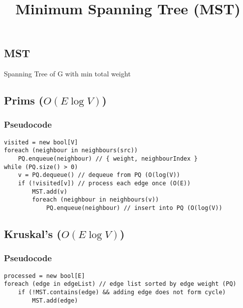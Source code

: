 \documentclass[12pt]{article}
\title{\textbf{Minimum Spanning Tree (MST)}}
\date{}
\begin{document}
\maketitle

\begin{spacing}{1.5}

\section{MST}

\begin{itemize*}
	\item Spanning Tree of G with min total weight
\end{itemize*}
 
\subsection{Prims ($O(E\log{V})$)}

\subsubsection{Pseudocode}

\begin{verbatim}
visited = new bool[V]
foreach (neighbour in neighbours(src))
    PQ.enqueue(neighbour) // { weight, neighbourIndex }
while (PQ.size() > 0)
    v = PQ.dequeue() // dequeue from PQ (O(log(V))
    if (!visited[v]) // process each edge once (O(E))
        MST.add(v)
        foreach (neighbour in neighbours(v))
            PQ.enqueue(neighbour) // insert into PQ (O(log(V))
\end{verbatim}

\subsection{Kruskal's ($O(E\log{V})$)}

\subsubsection{Pseudocode}

\begin{verbatim}
processed = new bool[E]
foreach (edge in edgeList) // edge list sorted by edge weight (PQ)
    if (!MST.contains(edge) && adding edge does not form cycle)
        MST.add(edge)
\end{verbatim}

\end{spacing}
\end{document}
